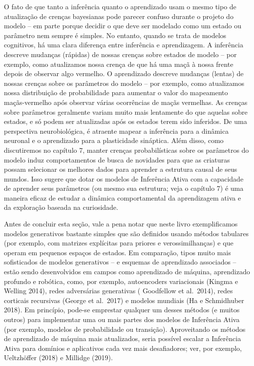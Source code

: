 \documentclass[
  12pt,
]{book}
\begin{document}
O fato de que tanto a inferência quanto o aprendizado usam o mesmo tipo de atualização de crenças bayesianas pode parecer confuso durante o projeto do modelo -- em parte porque decidir o que deve ser modelado como um estado ou parâmetro nem sempre é simples. No entanto, quando se trata de modelos cognitivos, há uma clara diferença entre inferência e aprendizagem. A inferência descreve mudanças (rápidas) de nossas crenças sobre estados de modelo -- por exemplo, como atualizamos nossa crença de que há uma maçã à nossa frente depois de observar algo vermelho. O aprendizado descreve mudanças (lentas) de nossas crenças sobre os parâmetros do modelo -- por exemplo, como atualizamos nossa distribuição de probabilidade para aumentar o valor do mapeamento maçãs-vermelho após observar várias ocorrências de maçãs vermelhas. As crenças sobre parâmetros geralmente variam muito mais lentamente do que aquelas sobre estados, e só podem ser atualizadas após os estados terem sido inferidos. De uma perspectiva neurobiológica, é atraente mapear a inferência para a dinâmica neuronal e o aprendizado para a plasticidade sináptica. Além disso, como discutiremos no capítulo 7, manter crenças probabilísticas sobre os parâmetros do modelo induz comportamentos de busca de novidades para que as criaturas possam selecionar os melhores dados para aprender a estrutura causal de seus mundos. Isso sugere que dotar os modelos de Inferência Ativa com a capacidade de aprender seus parâmetros (ou mesmo sua estrutura; veja o capítulo 7) é uma maneira eficaz de estudar a dinâmica comportamental da aprendizagem ativa e da exploração baseada na curiosidade.

Antes de concluir esta seção, vale a pena notar que neste livro exemplificamos modelos generativos bastante simples que são definidos usando métodos tabulares (por exemplo, com matrizes explícitas para priores e verossimilhanças) e que operam em pequenos espaços de estados. Em comparação, tipos muito mais sofisticados de modelos generativos -- e esquemas de aprendizado associados -- estão sendo desenvolvidos em campos como aprendizado de máquina, aprendizado profundo e robótica, como, por exemplo, autoencoders variacionais (Kingma e Welling 2014), redes adversárias generativas ( Goodfellow et al.~2014), redes corticais recursivas (George et al.~2017) e modelos mundiais (Ha e Schmidhuber 2018). Em princípio, pode-se emprestar qualquer um desses métodos (e muitos outros) para implementar uma ou mais partes dos modelos de Inferência Ativa (por exemplo, modelos de probabilidade ou transição). Aproveitando os métodos de aprendizado de máquina mais atualizados, seria possível escalar a Inferência Ativa para domínios e aplicativos cada vez mais desafiadores; ver, por exemplo, Ueltzhöffer (2018) e Millidge (2019).
\end{document}
